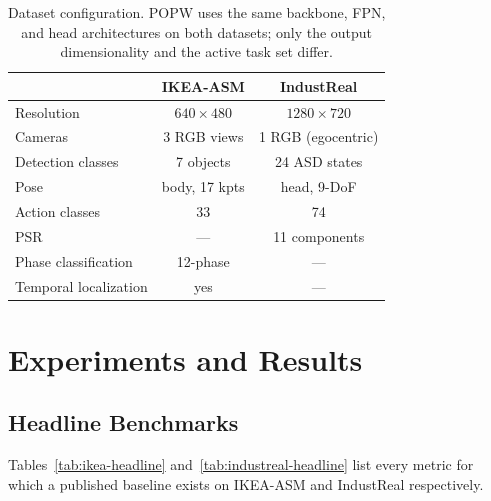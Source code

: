 \documentclass[11pt,a4paper]{article}
\newcommand{\popw}{POPW}
\newcommand{\ikea}{IKEA-ASM}
\newcommand{\industreal}{IndustReal}
\begin{document}
\begin{table}[!htbp]
\centering
\small
\caption{Dataset configuration. \popw{} uses the same backbone, FPN, and head architectures on both datasets; only the output dimensionality and the active task set differ.}
\label{tab:dataset-config}
\begin{tabular}{l c c}
\toprule
 & \ikea{} & \industreal{} \\
\midrule
Resolution                      & $640\times480$ & $1280\times720$ \\
Cameras                         & 3 RGB views      & 1 RGB (egocentric) \\
Detection classes               & 7 objects        & 24 ASD states \\
Pose                            & body, 17 kpts    & head, 9-DoF \\
Action classes                  & 33               & 74 \\
PSR                             & ---              & 11 components \\
Phase classification           & 12-phase         & --- \\
Temporal localization           & yes              & --- \\
\bottomrule
\end{tabular}
\end{table}

\section{Experiments and Results}
\label{sec:experiments}

\subsection{Headline Benchmarks}

Tables~\ref{tab:ikea-headline} and~\ref{tab:industreal-headline} list every metric for which a published baseline exists on \ikea{} and \industreal{} respectively.
\end{document}
